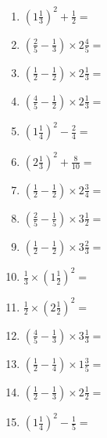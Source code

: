 \documentclass[12pt]{article}
\begin{document}
\begin{enumerate}
\item \large $ \left( 1 \frac{1}{3} \right)^2 + \frac{1}{2} = $ \vspace{1.6cm}
\item \large $ \left( \frac{2}{5} - \frac{1}{3} \right) \times 2 \frac{4}{5} = $ \vspace{1.6cm}
\item \large $ \left( \frac{1}{2} - \frac{1}{2} \right) \times 2 \frac{1}{3} = $ \vspace{1.6cm}
\item \large $ \left( \frac{4}{5} - \frac{1}{2} \right) \times 2 \frac{1}{3} = $ \vspace{1.6cm}
\item \large $ \left( 1 \frac{1}{4} \right)^2 - \frac{2}{4} = $ \vspace{1.6cm}
\item \large $ \left( 2 \frac{1}{3} \right)^2 + \frac{8}{10} = $ \vspace{1.6cm}
\item \large $ \left( \frac{1}{2} - \frac{1}{2} \right) \times 2 \frac{3}{4} = $ \vspace{1.6cm}
\item \large $ \left( \frac{2}{5} - \frac{1}{5} \right) \times 3 \frac{1}{2} = $ \vspace{1.6cm}
\item \large $ \left( \frac{1}{2} - \frac{1}{2} \right) \times 3 \frac{2}{3} = $ \vspace{1.6cm}
\item \large $ \frac{1}{3} \times \left( 1 \frac{1}{2} \right)^2 = $ \vspace{1.6cm}
\newpage
\item \large $ \frac{1}{2} \times \left( 2 \frac{1}{2} \right)^2 = $ \vspace{1.6cm}
\item \large $ \left( \frac{4}{5} - \frac{1}{3} \right) \times 3 \frac{1}{3} = $ \vspace{1.6cm}
\item \large $ \left( \frac{1}{2} - \frac{1}{4} \right) \times 1 \frac{3}{5} = $ \vspace{1.6cm}
\item \large $ \left( \frac{1}{2} - \frac{1}{3} \right) \times 2 \frac{1}{2} = $ \vspace{1.6cm}
\item \large $ \left( 1 \frac{1}{4} \right)^2 - \frac{1}{5} = $ \vspace{1.6cm}

\end{enumerate}
\end{document}
